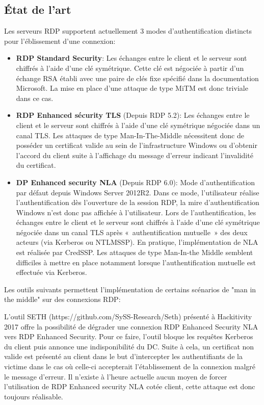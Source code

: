 \subsection{État de l'art}
Les serveurs RDP supportent actuellement 3 modes d'authentification distincts pour l'\'eblissement d'une connexion:
\begin{itemize}
\item \textbf{RDP Standard Security}: Les \'echanges entre le client et le serveur sont chiffrés à l'aide d'une clé symétrique. Cette clé est négociée à partir d'un échange RSA établi avec une paire de clés fixe spécifié dans la documentation Microsoft. La mise en place d'une attaque de type MiTM est donc triviale dans ce cas.
\item \textbf{RDP Enhanced s\'ecurity TLS} (Depuis RDP 5.2): Les échanges entre le client et le serveur sont chiffrés à l'aide d'une clé symétrique négociée dans un canal TLS. Les attaques de type Man-In-The-Middle nécessitent donc de posséder un certificat valide au sein de l'infrastructure Windows ou d'obtenir l'accord du client suite à l'affichage du message d'erreur indicant l'invalidité du certificat.  
\item \textbf{DP Enhanced security NLA} (Depuis RDP 6.0): Mode d'authentification par d\'efaut depuis Windows Server 2012R2. Dans ce mode, l'utilisateur réalise l'authentification dès l'ouverture de la session RDP, la mire d'authentification Windows n'est donc pas affichée à l'utilisateur. Lors de l'authentification, les échanges entre le client et le serveur sont chiffrés à l'aide d'une clé symétrique négociée dans un canal TLS après « authentification mutuelle » des deux acteurs (via Kerberos ou NTLMSSP). En pratique, l'implémentation de NLA est réalisée par CredSSP. Les attaques de type Man-In-the Middle semblent difficiles à mettre en place notamment lorsque l’authentification mutuelle est effectuée via Kerberos.
\end{itemize}

Les outils suivants permettent l'impl\'ementation de certains scénarios de "man in the middle" sur des connexions RDP:

L’outil SETH (https://github.com/SySS-Research/Seth) pr\'esenté à Hackitivity 2017 offre la possibilité de dégrader une connexion RDP Enhanced Security NLA vers RDP Enhanced Security. Pour ce faire, l’outil bloque les requêtes Kerberos du client puis annonce une indisponibilité du DC. Suite à cela, un certificat non valide est présenté au client dans le but d’intercepter les authentifiants de la victime dans le cas où celle-ci accepterait l’établissement de la connexion malgré le message d'erreur. Il n’existe à l’heure actuelle aucun moyen de forcer l’utilisation de RDP Enhanced security NLA cotée client, cette attaque est donc toujours réalisable.

